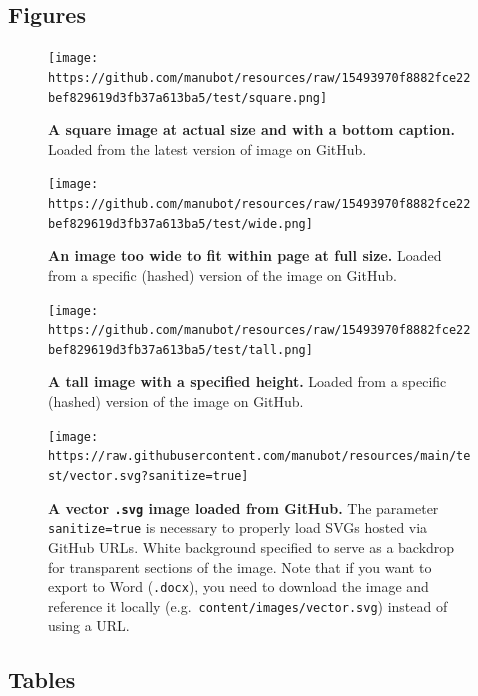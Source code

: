 \documentclass[
]{article}
\begin{document}
\hypertarget{figures}{%
\subsection{Figures}\label{figures}}

\begin{figure}
\hypertarget{fig:square-image}{%
\centering
\texttt{[image: https://github.com/manubot/resources/raw/15493970f8882fce22bef829619d3fb37a613ba5/test/square.png]}
\caption{\textbf{A square image at actual size and with a bottom caption.}
Loaded from the latest version of image on GitHub.}\label{fig:square-image}
}
\end{figure}

\begin{figure}
\hypertarget{fig:wide-image}{%
\centering
\texttt{[image: https://github.com/manubot/resources/raw/15493970f8882fce22bef829619d3fb37a613ba5/test/wide.png]}
\caption{\textbf{An image too wide to fit within page at full size.}
Loaded from a specific (hashed) version of the image on GitHub.}\label{fig:wide-image}
}
\end{figure}

\begin{figure}
\hypertarget{fig:tall-image}{%
\centering
\texttt{[image: https://github.com/manubot/resources/raw/15493970f8882fce22bef829619d3fb37a613ba5/test/tall.png]}
\caption{\textbf{A tall image with a specified height.}
Loaded from a specific (hashed) version of the image on GitHub.}\label{fig:tall-image}
}
\end{figure}

\begin{figure}
\hypertarget{fig:vector-image}{%
\centering
\texttt{[image: https://raw.githubusercontent.com/manubot/resources/main/test/vector.svg?sanitize=true]}
\caption{\textbf{A vector \texttt{.svg} image loaded from GitHub.}
The parameter \texttt{sanitize=true} is necessary to properly load SVGs hosted via GitHub URLs.
White background specified to serve as a backdrop for transparent sections of the image.
Note that if you want to export to Word (\texttt{.docx}), you need to download the image and reference it locally (e.g.~\texttt{content/images/vector.svg}) instead of using a URL.}\label{fig:vector-image}
}
\end{figure}

\hypertarget{tables}{%
\subsection{Tables}\label{tables}}
\end{document}
